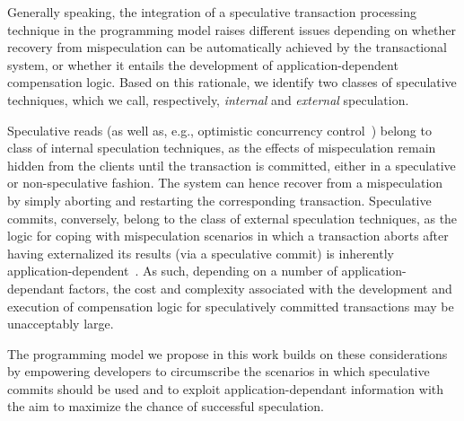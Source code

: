 Generally speaking, the integration of a speculative transaction processing technique in the programming model raises different issues depending on whether recovery from mispeculation can be automatically achieved by the transactional system, or whether it entails the development of application-dependent compensation logic. Based on this rationale, we identify two classes of speculative techniques, which we call, respectively, \textit{internal} and \textit{external} speculation.

Speculative reads (as well as, e.g., optimistic concurrency control~\cite{xxxx}) belong to class of internal speculation techniques, as the effects of mispeculation remain hidden from the clients until the transaction is committed, either in a speculative or non-speculative fashion. The system can hence recover from a mispeculation by simply aborting and restarting the corresponding transaction. Speculative commits, conversely, belong to the class of external speculation techniques, as the logic for coping with mispeculation scenarios in which a transaction aborts after having externalized its results  (via a speculative commit) is inherently application-dependent~\cite{eventual-consistency}. As such, depending on a number of application-dependant factors, the cost and complexity associated with the development and execution of compensation logic for speculatively committed transactions may be unacceptably large.

The programming model we propose in this work builds on these considerations by empowering  developers to circumscribe the scenarios in which speculative commits should be used and to exploit application-dependant information with the aim to maximize the chance of successful speculation.

